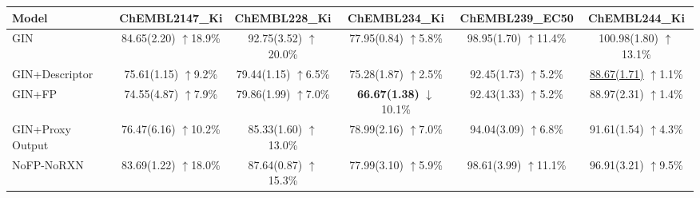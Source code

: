 \begin{table}[t]
\centering
\small
\setlength{\tabcolsep}{4pt}
\begin{tabular}{lccccc}
\hline
Model & ChEMBL2147\_Ki & ChEMBL228\_Ki & ChEMBL234\_Ki & ChEMBL239\_EC50 & ChEMBL244\_Ki \\
\hline
GIN & \shortstack{84.65(2.20)\\$\uparrow$18.9\%} & \shortstack{92.75(3.52)\\$\uparrow$20.0\%} & \shortstack{77.95(0.84)\\$\uparrow$5.8\%} & \shortstack{98.95(1.70)\\$\uparrow$11.4\%} & \shortstack{100.98(1.80)\\$\uparrow$13.1\%} \\

GIN+Descriptor & \shortstack{75.61(1.15)\\$\uparrow$9.2\%} & \shortstack{79.44(1.15)\\$\uparrow$6.5\%} & \shortstack{75.28(1.87)\\$\uparrow$2.5\%} & \shortstack{92.45(1.73)\\$\uparrow$5.2\%} & \shortstack{\underline{88.67(1.71)}\\$\uparrow$1.1\%} \\

GIN+FP & \shortstack{74.55(4.87)\\$\uparrow$7.9\%} & \shortstack{79.86(1.99)\\$\uparrow$7.0\%} & \shortstack{\textbf{66.67(1.38)}\\$\downarrow$10.1\%} & \shortstack{92.43(1.33)\\$\uparrow$5.2\%} & \shortstack{88.97(2.31)\\$\uparrow$1.4\%} \\

GIN+Proxy Output & \shortstack{76.47(6.16)\\$\uparrow$10.2\%} & \shortstack{85.33(1.60)\\$\uparrow$13.0\%} & \shortstack{78.99(2.16)\\$\uparrow$7.0\%} & \shortstack{94.04(3.09)\\$\uparrow$6.8\%} & \shortstack{91.61(1.54)\\$\uparrow$4.3\%} \\

NoFP-NoRXN & \shortstack{83.69(1.22)\\$\uparrow$18.0\%} & \shortstack{87.64(0.87)\\$\uparrow$15.3\%} & \shortstack{77.99(3.10)\\$\uparrow$5.9\%} & \shortstack{98.61(3.99)\\$\uparrow$11.1\%} & \shortstack{96.91(3.21)\\$\uparrow$9.5\%} \\


\end{tabular}
\end{table}
